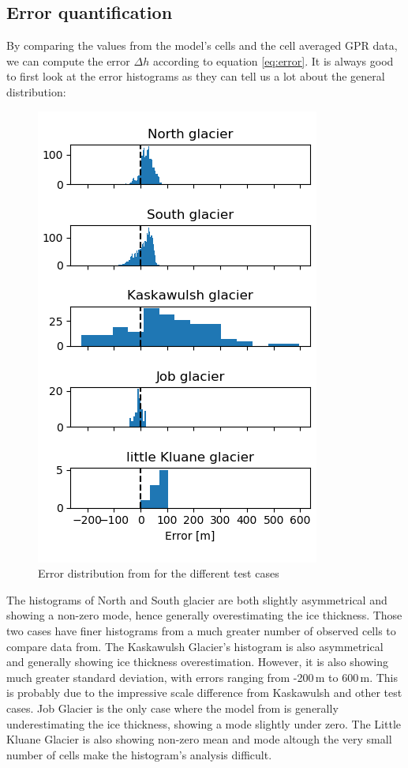 \documentclass[a4, 12pt]{article}
\begin{document}
\subsection{Error quantification}
By comparing the values from the model's cells and the cell averaged GPR data, we can compute the error $\Delta h$ according to equation \ref{eq:error}. It is always good to first look at the error histograms as they can tell us a lot about the general distribution:
\begin{figure}[h]
\centering
\includegraphics[width=0.5\linewidth]{../imgs/hists.png}
\caption{Error distribution from \citet{farinotti2019consensus} for the different test cases}
\label{fig:hists}
\end{figure}
\FloatBarrier
The histograms of North and South glacier are both slightly asymmetrical and showing a non-zero mode, hence generally overestimating the ice thickness. Those two cases have finer histograms from a much greater number of observed cells to compare data from. The Kaskawulsh Glacier's histogram is also asymmetrical and generally showing ice thickness overestimation. However, it is also showing much greater standard deviation, with errors ranging from -200\,m to 600\,m. This is probably due to the impressive scale difference from Kaskawulsh and other test cases. Job Glacier is the only case where the model from \citet{farinotti2019consensus} is generally underestimating the ice thickness, showing a mode slightly under zero. The Little Kluane Glacier is also showing non-zero mean and mode altough the very small number of cells make the histogram's analysis difficult.
\end{document}
